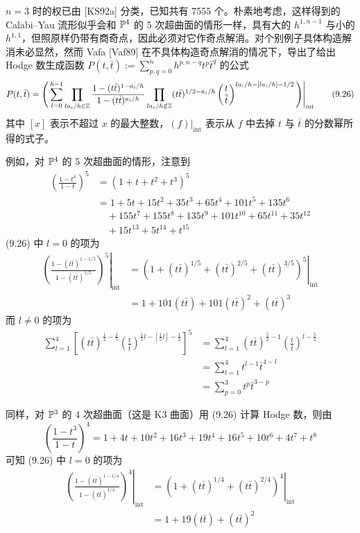 $n=3$ 时的权已由 [KS92a] 分类，已知共有 7555 个。朴素地考虑，这样得到的 Calabi--Yau 流形似乎会和 $\mathbb{P}^4$ 的 5 次超曲面的情形一样，具有大的 $h^{1,n-1}$ 与小的 $h^{1,1}$，但照原样仍带有商奇点，因此必须对它作奇点解消。对个别例子具体构造解消未必显然，然而 Vafa [Vaf89] 在不具体构造奇点解消的情况下，导出了给出 Hodge 数生成函数 $P(t,\bar t):=\sum_{p,q=0}^{n}h^{p,n-q}t^p\bar t^q$ 的公式
\begin{equation}
  P(t,\bar t)=\Bigg(\sum_{l=0}^{h-1}\prod_{la_i/h\in\mathbb{Z}}\frac{1-(t\bar t)^{1-a_i/h}}{1-(t\bar t)^{a_i/h}}\prod_{la_i/h\notin\mathbb{Z}}(t\bar t)^{1/2-a_i/h}\left(\frac{t}{\bar t}\right)^{la_i/h-[la_i/h]-1/2}\Bigg)\Bigg|_{\mathrm{int}}
  \tag{9.26}
\end{equation}
其中 $[x]$ 表示不超过 $x$ 的最大整数，$(f)|_{\mathrm{int}}$ 表示从 $f$ 中去掉 $t$ 与 $\bar t$ 的分数幂所得的式子。

例如，对 $\mathbb{P}^4$ 的 5 次超曲面的情形，注意到
\begin{align}
  \left(\frac{1-t^4}{1-t}\right)^5 &= (1+t+t^2+t^3)^5 \tag{9.27}\\
  &= 1+5t+15t^2+35t^3+65t^4+101t^5+135t^6 \tag{9.28}\\
  &\quad +155t^7+155t^8+135t^9+101t^{10}+65t^{11}+35t^{12} \tag{9.29}\\
  &\quad +15t^{13}+5t^{14}+t^{15} \tag{9.30}
\end{align}
(9.26) 中 $l=0$ 的项为
\begin{align}
  \left.\left(\frac{1-(t\bar t)^{1-1/5}}{1-(t\bar t)^{1/5}}\right)^5\right|_{\mathrm{int}} &= \left.\left(1+(t\bar t)^{1/5}+(t\bar t)^{2/5}+(t\bar t)^{3/5}\right)^5\right|_{\mathrm{int}} \tag{9.31}\\
  &= 1+101(t\bar t)+101(t\bar t)^2+(t\bar t)^3 \tag{9.32}
\end{align}
而 $l\ne 0$ 的项为
\begin{align}
  \sum_{l=1}^{4}\left[(t\bar t)^{\frac{1}{2}-\frac{1}{5}}\left(\frac{t}{\bar t}\right)^{\frac{1}{5}l-\left[\frac{1}{5}l\right]-\frac{1}{2}}\right]^5 &= \sum_{l=1}^{4}(t\bar t)^{\frac{5}{2}-1}\left(\frac{t}{\bar t}\right)^{l-\frac{5}{2}} \tag{9.33}\\
  &= \sum_{l=1}^{4}t^{l-1}\bar t^{4-l} \tag{9.34}\\
  &= \sum_{p=0}^{3}t^p\bar t^{3-p} \tag{9.35}
\end{align}

同样，对 $\mathbb{P}^3$ 的 4 次超曲面（这是 K3 曲面）用 (9.26) 计算 Hodge 数，则由
\begin{equation}
  \left(\frac{1-t^3}{1-t}\right)^4=1+4t+10t^2+16t^3+19t^4+16t^5+10t^6+4t^7+t^8
  \tag{9.36}
\end{equation}
可知 (9.26) 中 $l=0$ 的项为
\begin{align}
  \left.\left(\frac{1-(t\bar t)^{1-1/4}}{1-(t\bar t)^{1/4}}\right)^4\right|_{\mathrm{int}} &= \left.\left(1+(t\bar t)^{1/4}+(t\bar t)^{2/4}\right)^4\right|_{\mathrm{int}} \tag{9.37}\\
  &= 1+19(t\bar t)+(t\bar t)^2 \tag{9.38}
\end{align}
